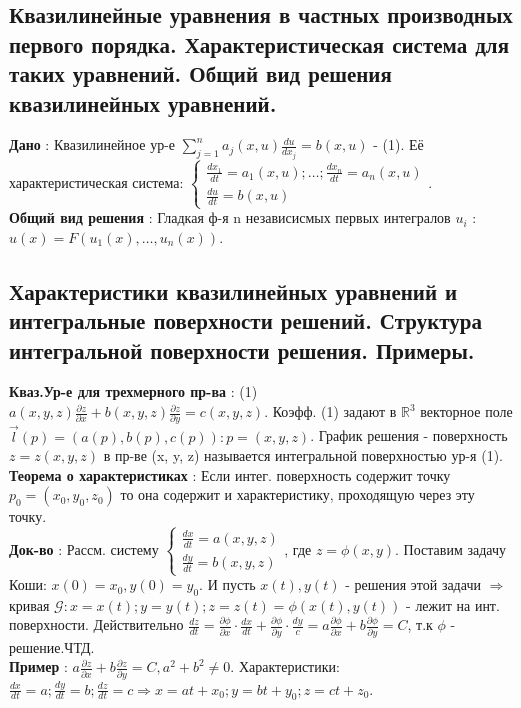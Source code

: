 \documentclass[unicode, 8pt, a4paper,oneside, landscape]{article}
\begin{document}
\begin{multicols}{4}

\subsection{Квазилинейные уравнения в частных производных первого порядка. Характеристическая система для таких уравнений. Общий вид решения квазилинейных уравнений.}

{\bf Дано} : Квазилинейное ур-е $\sum_{j=1}^n a_j(x, u) \frac{du}{dx_j} = b(x,u)$ - (1). Её характеристическая система: $\begin{cases} \frac{dx_1}{dt} = a_1(x,u); \ldots; \frac{dx_n}{dt} = a_n(x,u) \\ \frac{du}{dt} = b(x, u) \end{cases}$.\\
{\bf Общий вид решения} : Гладкая ф-я n независисмых первых интегралов $u_i$ : $u(x) = F(u_1(x), \ldots, u_{n}(x))$.


\subsection{Характеристики квазилинейных уравнений и интегральные поверхности решений. Структура интегральной поверхности решения. Примеры.}

{\bf Кваз.Ур-е для трехмерного пр-ва} : (1) $a(x, y, z)\frac{\partial z}{\partial x} + b(x, y, z)\frac{\partial z}{\partial y} = c(x, y, z)$. Коэфф. (1) задают в $\mathbb{R}^3$ векторное поле $\vec{l}(p) = (a(p), b(p), c(p)) : p = (x, y, z)$. График решения - поверхность $z = z(x, y, z)$ в пр-ве (x, y, z) называется интегральной поверхностью ур-я (1).\\
{\bf Теорема о характеристиках} : Если интег. поверхность содержит точку $p_0 = (x_0, y_0, z_0)$ то она содержит и характеристику, проходящую через эту точку.\\
{\bf Док-во} : Рассм. систему $\begin{cases} \frac{dx}{dt} = a(x, y, z) \\ \frac{dy}{dt} = b(x, y, z) \end{cases}$, где $z = \phi(x, y)$. Поставим задачу Коши: $x(0) = x_0, y(0) = y_0$. И пусть $x(t), y(t)$ - решения этой задачи $\Rightarrow$ кривая $\mathcal{G}: x = x(t); y = y(t); z = z(t) = \phi(x(t), y(t))$ - лежит на инт. поверхности. Действительно $\frac{dz}{dt} = \frac{\partial \phi}{\partial x}\cdot \frac{dx}{dt} + \frac{\partial \phi}{\partial y}\cdot\frac{dy}{c} = a\frac{\partial \phi}{\partial x} + b\frac{\partial \phi}{\partial y} = C$, т.к $\phi$ - решение.ЧТД.\\
{\bf Пример} : $a\frac{\partial z}{\partial x} + b\frac{\partial z}{\partial y} = C, a^2 + b^2 \neq 0$. Характеристики: $\frac{dx}{dt} = a; \frac{dy}{dt} = b; \frac{dz}{dt} = c \Rightarrow x = at+x_0; y = bt+y_0; z = ct+z_0$.


\end{multicols}
\end{document}
